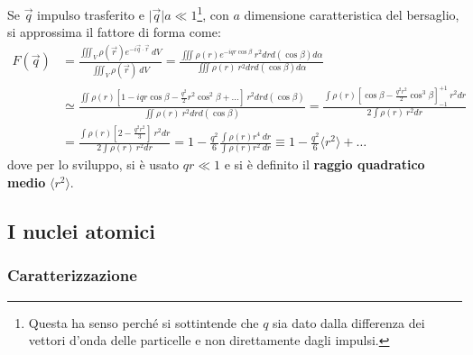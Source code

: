 \documentclass[10pt, a4paper]{scrartcl}
\numberwithin{equation}{subsection}
\theoremstyle{style1}
\begin{document}
Se $\vec{q}$ impulso trasferito e $\lvert \vec{q} \rvert a \ll 1$\footnote{Questa ha senso perch\'e si sottintende che $q$ sia dato dalla differenza dei vettori d'onda delle particelle e non direttamente dagli impulsi.}, con $a$ dimensione caratteristica del bersaglio, si approssima il fattore di forma come:
\[
\begin{split}
	F(\vec{q}) &= \frac{\displaystyle \iiint_{V} \rho (\vec{r}) e^{- i \vec{q}\cdot \vec{r}}\ dV}{\displaystyle \iiint_{V}  \rho (\vec{r}) \ dV} = \frac{\displaystyle \iiint \rho (r) e^{- i q r \cos \beta }  \ r^2 dr d (\cos \beta ) d\alpha }{ \displaystyle \iiint \rho (r) \ r^2 d r d(\cos\beta )d\alpha  }\\
	&\simeq \frac{\displaystyle \iint \rho (r) \left[ 1- i qr \cos \beta  - \frac{q^2}{2} r^2 \cos^2 \beta  + \ldots \right] \ r^2 dr d(\cos \beta ) }{\displaystyle  \iint \rho  (r) \ r^2 dr d(\cos \beta )} = \frac{\displaystyle \int \rho (r) \left[ \cos\beta  - \frac{q^2 r^2}{2} \cos^3 \beta  \right] _{-1} ^{+1} \ r^2 dr}{\displaystyle 2 \int \rho (r) \ r^2 dr}\\
	&= \frac{\displaystyle \int \rho (r) \left[ 2 - \frac{q^2 r^2}{3} \right] \ r^2 dr}{\displaystyle 2 \int \rho (r) \ r^2 dr} = 1 - \frac{q^2}{6} \frac{\displaystyle \int \rho (r)  r^4 \ dr}{ \displaystyle  \int \rho (r) r^2 \ dr} \equiv 1 - \frac{q^2}{6} \langle r^2 \rangle + \ldots
\end{split}
\] 
dove per lo sviluppo, si \`e usato $qr \ll 1$ e si \`e definito il \textbf{raggio quadratico medio} $\langle r^2 \rangle$.




























\subsection{I nuclei atomici}

\subsubsection{Caratterizzazione}
\end{document}
